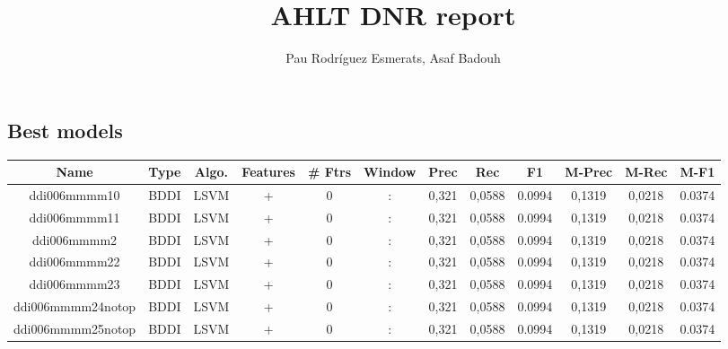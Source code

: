 \documentclass[a4paper]{article}
\title{AHLT DNR report}
\author{Pau Rodríguez Esmerats, Asaf Badouh }
\begin{document}
\begin{landscape}

\section{ Best models}
\begin{center}
\begin{tabular}{ |c|c|c|c|c|c|c|c|c|c|c|c|} 
 \hline
 	Name & Type & Algo. & Features & \# Ftrs & Window & Prec & Rec & F1 & M-Prec & M-Rec & M-F1\\
 \hline
 
 	
 		
 		\small{ ddi006mmmm10 } & BDDI & LSVM & +  &  0 &  :  &  0,321 & 0,0588 & 0.0994  &  0,1319 & 0,0218 & 0.0374 \\
 		

 	
 
 	
 		
 		\small{ ddi006mmmm11 } & BDDI & LSVM & +  &  0 &  :  &  0,321 & 0,0588 & 0.0994  &  0,1319 & 0,0218 & 0.0374 \\
 		

 	
 
 	
 		
 		\small{ ddi006mmmm2 } & BDDI & LSVM & +  &  0 &  :  &  0,321 & 0,0588 & 0.0994  &  0,1319 & 0,0218 & 0.0374 \\
 		

 	
 
 	
 		
 		\small{ ddi006mmmm22 } & BDDI & LSVM & +  &  0 &  :  &  0,321 & 0,0588 & 0.0994  &  0,1319 & 0,0218 & 0.0374 \\
 		

 	
 
 	
 		
 		\small{ ddi006mmmm23 } & BDDI & LSVM & +  &  0 &  :  &  0,321 & 0,0588 & 0.0994  &  0,1319 & 0,0218 & 0.0374 \\
 		

 	
 
 	
 		
 		\small{ ddi006mmmm24notop } & BDDI & LSVM & +  &  0 &  :  &  0,321 & 0,0588 & 0.0994  &  0,1319 & 0,0218 & 0.0374 \\
 		

 	
 
 	
 		
 		\small{ ddi006mmmm25notop } & BDDI & LSVM & +  &  0 &  :  &  0,321 & 0,0588 & 0.0994  &  0,1319 & 0,0218 & 0.0374 \\
 		


\end{tabular}
\end{center}
\end{landscape}
\end{document}
